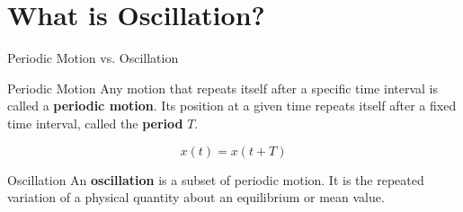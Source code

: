 \documentclass[aspectratio=169,xcolor=dvipsnames]{beamer}
\begin{document}
\section{What is Oscillation?}

\begin{frame}{Periodic Motion vs. Oscillation}
  \begin{umdefinition}{Periodic Motion}
    Any motion that repeats itself after a specific time interval is called a \textbf{periodic motion}. Its position at a given time repeats itself after a fixed time interval, called the \textbf{period} $T$.
  \end{umdefinition}

  \begin{umformula}
    \begin{equation}
      x(t) = x(t + T)
    \end{equation}
  \end{umformula}

  \begin{umdefinition}{Oscillation}
    An \textbf{oscillation} is a subset of periodic motion. It is the repeated variation of a physical quantity about an equilibrium or mean value.
  \end{umdefinition}
\end{frame}
\end{document}
